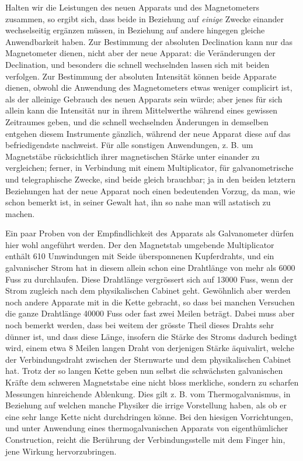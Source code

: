 Halten wir die Leistungen des neuen Apparats und des Magnetometers zusammen, so ergibt sich, dass beide in Beziehung auf \textit{einige} Zwecke einander wechselseitig ergänzen müssen, in Beziehung auf andere hingegen gleiche Anwendbarkeit haben. Zur Bestimmung der absoluten Declination kann nur das Magnetometer dienen, nicht aber der neue Apparat: die Veränderungen der Declination, und besonders die schnell wechselnden lassen sich mit beiden verfolgen. Zur Bestimmung der absoluten Intensität können beide Apparate dienen, obwohl die Anwendung des Magnetometers etwas weniger complicirt ist, als der alleinige Gebrauch des neuen Apparats sein würde; aber jenes für sich allein kann die Intensität nur in ihrem Mittelwerthe während eines gewissen Zeitraumes geben, und die schnell wechselnden Änderungen in demselben entgehen diesem Instrumente gänzlich, während der neue Apparat diese auf das befriedigendste nachweist. Für alle sonstigen Anwendungen, z. B. um Magnetstäbe rücksichtlich ihrer magnetischen Stärke unter einander zu vergleichen; ferner, in Verbindung mit einem Multiplicator, für galvanometrische und telegraphische Zwecke, sind beide gleich brauchbar; ja in den beiden letztern Beziehungen hat der neue Apparat noch einen bedeutenden Vorzug, da man, wie schon bemerkt ist, in seiner Gewalt hat, ihn so nahe man will astatisch zu machen.

Ein paar Proben von der Empfindlichkeit des Apparats als Galvanometer dürfen hier wohl angeführt werden. Der den Magnetstab umgebende Multiplicator enthält 610 Umwindungen mit Seide übersponnenen Kupferdrahts, und ein galvanischer Strom hat in diesem allein schon eine Drahtlänge von mehr als 6000 Fuss zu durchlaufen. Diese Drahtlänge vergrössert sich auf 13000 Fuss, wenn der Strom zugleich nach dem physikalischen Cabinet geht. Gewöhnlich aber werden noch andere Apparate mit in die Kette gebracht, so dass bei manchen Versuchen die ganze Drahtlänge 40000 Fuss oder fast zwei Meilen beträgt. Dabei muss aber noch bemerkt werden, dass bei weitem der grösste Theil dieses Drahts sehr dünner ist, und dass diese Länge, insofern die Stärke des Stroms dadurch bedingt wird, einem etwa 8 Meilen langen Draht von derjenigen Stärke äquivalirt, welche der Verbindungsdraht zwischen der Sternwarte und dem physikalischen Cabinet hat. Trotz der so langen Kette geben nun selbst die schwächsten galvanischen Kräfte dem schweren Magnetstabe eine nicht bloss merkliche, sondern zu scharfen Messungen hinreichende Ablenkung. Dies gilt z. B. vom Thermogalvanismus, in Beziehung auf welchen manche Physiker die irrige Vorstellung haben, als ob er eine sehr lange Kette nicht durchdringen könne. Bei den hiesigen Vorrichtungen, und unter Anwendung eines thermogalvanischen Apparats von eigenthümlicher Construction, reicht die Berührung der Verbindungsstelle mit dem Finger hin, jene Wirkung hervorzubringen.


